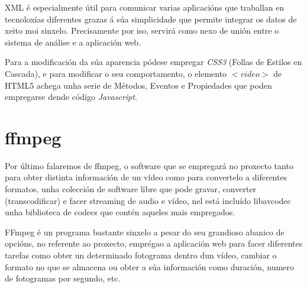     XML é especialmente útil para comunicar varias aplicacións que traballan en tecnoloxías 
    diferentes grazas á súa simplicidade que permite integrar os datos de xeito moi sinxelo. Precisamente
    por iso, servirá como nexo de unión entre o sistema de análise e a aplicación web. 
    
    Para a modificación da súa aparencia pódese empregar \emph{CSS3} (Follas de Estilos en 
    Cascada), e para modificar o seu comportamento, o elemento $<video>$ de HTML5 achega
    unha serie de Métodos, Eventos e Propiedades\cite{w3school-video-events} que poden
    empregarse dende código \emph{Javascript}.
    
\section{ffmpeg}
    Por último falaremos de ffmpeg, o software que se empregará no proxecto tanto para obter 
    distinta información de un vídeo como para convertelo a diferentes formatos, unha colección de 
    software libre que pode gravar, converter (transcodificar) e facer streaming de audio e vídeo,
    nel está incluído libavcodec unha biblioteca de codecs que contén aqueles mais empregados.
    
    FFmpeg é un programa bastante sinxelo a pesar do seu grandioso abanico de opcións, no referente
    ao proxecto, emprégao a aplicación web para facer diferentes tarefas como obter un determinado
    fotograma dentro dun vídeo, cambiar o formato no que se almacena ou obter a súa información como
    duración, numero de fotogramas por segundo, etc.
    